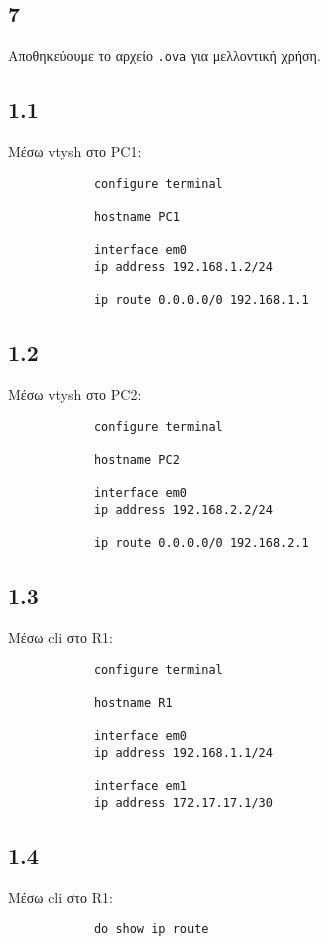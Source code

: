 \documentclass[a4paper, 12pt]{article}
\begin{document}
	\subsection*{7}
		Αποθηκεύουμε το αρχείο \verb|.ova| για μελλοντική χρήση.
	
	\subsection*{1.1}
		Μέσω vtysh στο PC1:
		
		\begin{verbatim}
			configure terminal
			
			hostname PC1
			
			interface em0
			ip address 192.168.1.2/24
			
			ip route 0.0.0.0/0 192.168.1.1
		\end{verbatim}

	\subsection*{1.2}
		Μέσω vtysh στο PC2:
		
		\begin{verbatim}
			configure terminal
			
			hostname PC2
			
			interface em0
			ip address 192.168.2.2/24
			
			ip route 0.0.0.0/0 192.168.2.1
		\end{verbatim}

	\subsection*{1.3}
		Μέσω cli στο R1:
		
		\begin{verbatim}
			configure terminal
			
			hostname R1
			
			interface em0
			ip address 192.168.1.1/24
			
			interface em1
			ip address 172.17.17.1/30
		\end{verbatim}

	\subsection*{1.4}
		Μέσω cli στο R1:
		
		\begin{verbatim}
			do show ip route
		\end{verbatim}
		
\end{document}
